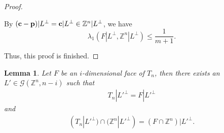 \documentclass{amsart}
\newtheorem{lemma}[theorem]{Lemma}
\theoremstyle{definition}
\theoremstyle{remark}
\numberwithin{equation}{section}
\begin{document}
\begin{proof}
\begin{enumerate}[fullwidth,itemindent=2em,label={\bf Case \arabic*.}]
By $({\bf c}-{\bf p})|L^\perp={\bf c}|L^\perp\in\mathbb{Z}^n|L^\perp$, we have
$$\lambda_1(F|L^\perp,\mathbb{Z}^n|L^\perp)\le\frac{1}{m+1}.$$
\end{enumerate}

Thus, this proof is finished.

    
\end{proof}



\begin{lemma}\label{lem:projTnZnFn}
    Let $F$ be an $i$-dimensional face of $T_n$, then there exists an $L'\in\mathcal{G}(\mathbb{Z}^n,n-i)$ such that
    \begin{align*}
       T_n|L'^\perp=F|L'^\perp
    \end{align*}
    and
    \begin{align*}
       (T_n|L'^\perp)\cap(\mathbb{Z}^n|L'^\perp)=(F\cap\mathbb{Z}^n)|L'^\perp. 
    \end{align*}
\end{lemma}
\end{document}
